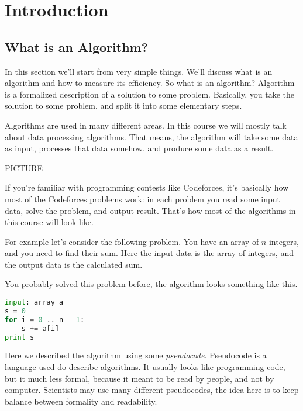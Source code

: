 \setchapterpreamble[u]{\margintoc}
\chapter{Introduction}

\section{What is an Algorithm?}

In this section we'll start from very simple things. We'll discuss what is an algorithm and how to measure its efficiency. So what is an algorithm? Algorithm is a formalized description of a solution to some problem. Basically, you take the solution to some problem, and split it into some elementary steps.

Algorithms are used in many different areas. In this course we will mostly talk about data processing algorithms. That means, the algorithm will take some data as input, processes that data somehow, and produce some data as a result.

PICTURE

If you're familiar with programming contests like Codeforces, it's basically how most of the Codeforces problems work: in each problem you read some input data, solve the problem, and output result. That's how most of the algorithms in this course will look like.

For example let's consider the following problem. You have an array of $n$ integers, and you need to find their sum. Here the input data is the array of integers, and the output data is the calculated sum. 

You probably solved this problem before, the algorithm looks something like this.

\begin{lstlisting}[style=kaolstplain,linewidth=1.5\textwidth,language=Python]
input: array a
s = 0
for i = 0 .. n - 1:
    s += a[i]
print s
\end{lstlisting}

Here we described the algorithm using some \emph{pseudocode}. Pseudocode is a language used do describe algorithms. It usually looks like programming code, but it much less formal, because it meant to be read by people, and not by computer. Scientists may use many different pseudocodes, the idea here is to keep balance between formality and readability. 

